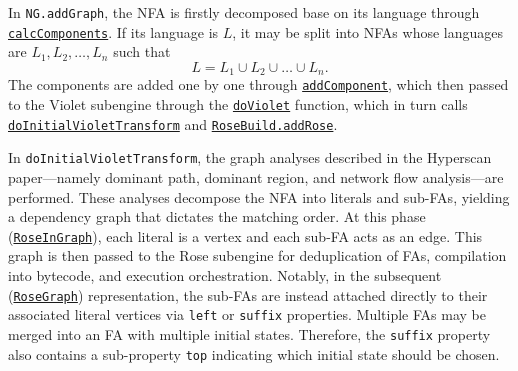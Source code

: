 In \texttt{NG.addGraph}, the NFA is firstly decomposed base on its language through \href{https://github.com/intel/hyperscan/blob/master/src/nfagraph/ng_calc_components.h#L47}{\texttt{calcComponents}}. If its language is $L$, it may be split into NFAs whose languages are $L_1, L_2, \ldots, L_n$ such that
$$L = L_1 \cup L_2 \cup \ldots \cup L_n.$$
The components are added one by one through \href{https://github.com/intel/hyperscan/blob/master/src/nfagraph/ng.cpp#L205}{\texttt{addComponent}}, which then passed to the Violet subengine through the \href{https://github.com/intel/hyperscan/blob/master/src/nfagraph/ng_violet.h#L49}{\texttt{doViolet}} function, which in turn calls \href{https://github.com/intel/hyperscan/blob/master/src/nfagraph/ng_violet.cpp#L2989}{\texttt{doInitialVioletTransform}} and \href{https://github.com/intel/hyperscan/blob/master/src/rose/rose_build_impl.h#L507}{\texttt{RoseBuild.addRose}}.

In \texttt{doInitialVioletTransform}, the graph analyses described in the Hyperscan paper---namely dominant path, dominant region, and network flow analysis---are performed. These analyses decompose the NFA into literals and sub-FAs, yielding a dependency graph that dictates the matching order. At this phase (\href{https://github.com/intel/hyperscan/blob/master/src/rose/rose_in_graph.h#L189}{\texttt{RoseInGraph}}), each literal is a vertex and each sub-FA acts as an edge. This graph is then passed to the Rose subengine for deduplication of FAs, compilation into bytecode, and execution orchestration. Notably, in the subsequent (\href{https://github.com/intel/hyperscan/blob/master/src/rose/rose_graph.h#L222}{\texttt{RoseGraph}}) representation, the sub-FAs are instead attached directly to their associated literal vertices via \texttt{left} or \texttt{suffix} properties. Multiple FAs may be merged into an FA with multiple initial states. Therefore, the \texttt{suffix} property also contains a sub-property \texttt{top} indicating which initial state should be chosen.


